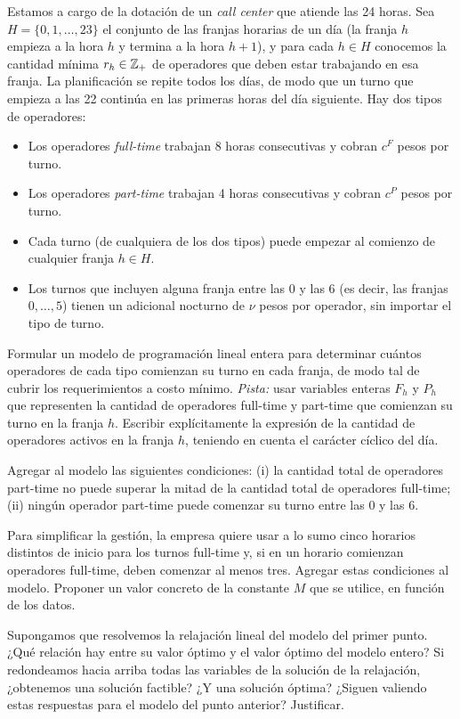 \documentclass[11pt,a4paper]{article}
\begin{document}
\newpage
Estamos a cargo de la dotación de un \emph{call center} que atiende las 24
horas. Sea $H = \{0, 1, \dots, 23\}$ el conjunto de las franjas horarias de un
día (la franja $h$ empieza a la hora $h$ y termina a la hora $h+1$), y para cada
$h \in H$ conocemos la cantidad mínima $r_h \in \mathbb{Z}_+$ de operadores que deben
estar trabajando en esa franja. La planificación se repite todos los días, de
modo que un turno que empieza a las 22 continúa en las primeras horas del día
siguiente. Hay dos tipos de operadores:

\begin{itemize}
  \item Los operadores \emph{full-time} trabajan 8 horas consecutivas y cobran
  $c^F$ pesos por turno.
  \item Los operadores \emph{part-time} trabajan 4 horas consecutivas y cobran
  $c^P$ pesos por turno.
  \item Cada turno (de cualquiera de los dos tipos) puede empezar al comienzo de
  cualquier franja $h \in H$.
  \item Los turnos que incluyen alguna franja entre las 0 y las 6 (es decir, las
  franjas $0, \dots, 5$) tienen un adicional nocturno de $\nu$ pesos por
  operador, sin importar el tipo de turno.
\end{itemize}

\begin{puntos}
  \item Formular un modelo de programación lineal entera para determinar
  cuántos operadores de cada tipo comienzan su turno en cada franja, de modo
  tal de cubrir los requerimientos a costo mínimo. \emph{Pista:} usar variables
  enteras $F_h$ y $P_h$ que representen la cantidad de operadores full-time y
  part-time que comienzan su turno en la franja $h$. Escribir explícitamente la
  expresión de la cantidad de operadores activos en la franja $h$, teniendo en
  cuenta el carácter cíclico del día.

  \item Agregar al modelo las siguientes condiciones: (i) la cantidad total de
  operadores part-time no puede superar la mitad de la cantidad total de
  operadores full-time; (ii) ningún operador part-time puede comenzar su turno
  entre las 0 y las 6.

  \item Para simplificar la gestión, la empresa quiere usar a lo sumo cinco
  horarios distintos de inicio para los turnos full-time y, si en un horario
  comienzan operadores full-time, deben comenzar al menos tres. Agregar estas
  condiciones al modelo. Proponer un valor concreto de la constante $M$ que se
  utilice, en función de los datos.

  \item Supongamos que resolvemos la relajación lineal del modelo del primer
  punto. ¿Qué relación hay entre su valor óptimo y el valor óptimo del modelo
  entero? Si redondeamos hacia arriba todas las variables de la solución de la
  relajación, ¿obtenemos una solución factible? ¿Y una solución óptima? ¿Siguen
  valiendo estas respuestas para el modelo del punto anterior? Justificar.
\end{puntos}
\end{document}
